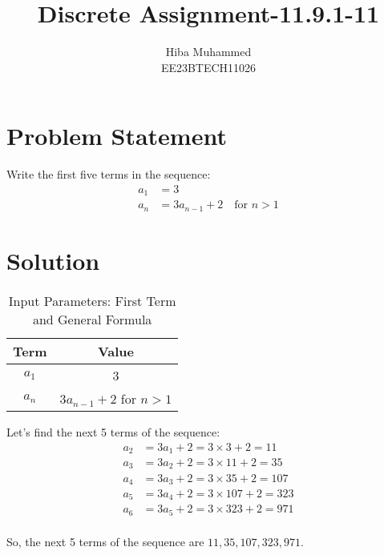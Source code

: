 \documentclass[12pt]{article}
\begin{document}
\title{Discrete Assignment-11.9.1-11}
\author{Hiba Muhammed \\
        EE23BTECH11026}
\maketitle

\section*{Problem Statement}
Write the first five terms in the sequence:
\[
\begin{aligned}
a_1 &= 3 \\
a_n &= 3a_{n-1} + 2 \quad \text{for } n > 1
\end{aligned}
\]

\section*{Solution}
\begin{table}[h]
  \centering
  \caption{Input Parameters: First Term and General Formula}
  \begin{tabular}{|c|c|}
    \hline
    \textbf{Term} & \textbf{Value} \\
    \hline
    \(a_1\) & 3 \\
    \(a_n\) & \(3a_{n-1} + 2\) for \(n > 1\) \\
    \hline
  \end{tabular}
\end{table}

Let's find the next 5 terms of the sequence:
\[
\begin{aligned}
a_2 &= 3a_1 + 2 = 3 \times 3 + 2 = 11 \\
a_3 &= 3a_2 + 2 = 3 \times 11 + 2 = 35 \\
a_4 &= 3a_3 + 2 = 3 \times 35 + 2 = 107 \\
a_5 &= 3a_4 + 2 = 3 \times 107 + 2 = 323 \\
a_6 &= 3a_5 + 2 = 3 \times 323 + 2 = 971 \\
\end{aligned}
\]

So, the next 5 terms of the sequence are \(11, 35, 107, 323, 971\).
\end{document}
